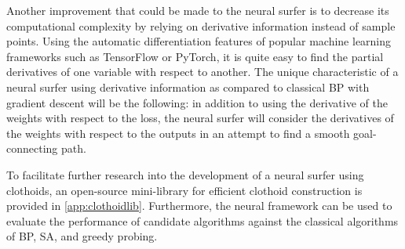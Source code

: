 Another improvement that could be made to the neural surfer is to decrease its computational complexity by relying on derivative information instead of sample points.
Using the automatic differentiation features of popular machine learning frameworks such as TensorFlow or PyTorch, it is quite easy to find the partial derivatives of one variable with respect to another.
The unique characteristic of a neural surfer using derivative information as compared to classical BP with gradient descent will be the following:
in addition to using the derivative of the weights with respect to the loss, the neural surfer will consider the derivatives of the weights with respect to the outputs in an attempt to find a smooth goal-connecting path.

To facilitate further research into the development of a neural surfer using clothoids, an open-source mini-library for efficient clothoid construction is provided in \ref{app:clothoidlib}.
Furthermore, the neural framework can be used to evaluate the performance of candidate algorithms against the classical algorithms of BP, SA, and greedy probing.
